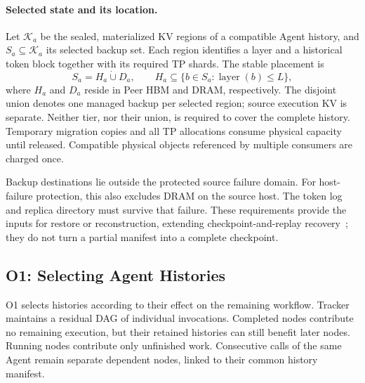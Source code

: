 \paragraph{Selected state and its location.}
Let $\mathcal K_a$ be the sealed, materialized KV regions of a compatible
Agent history, and $S_a\subseteq\mathcal K_a$ its selected backup set.
Each region identifies a layer and a historical token block together
with its required TP shards. The stable placement is
\begin{equation}
 S_a=H_a\mathbin{\dot\cup}D_a,\qquad
 H_a\subseteq\{b\in S_a:\operatorname{layer}(b)\le L\},
 \label{eq:teacher-placement}
\end{equation}
where $H_a$ and $D_a$ reside in Peer HBM and DRAM, respectively. The
disjoint union denotes one managed backup per selected region; source
execution KV is separate. Neither tier, nor their union, is required
to cover the complete history. Temporary migration copies and all TP
allocations consume physical capacity until released. Compatible
physical objects referenced by multiple consumers are charged once.

Backup destinations lie outside the protected source failure domain.
For host-failure protection, this also excludes DRAM on the source host.
The token log and replica directory must survive that failure. These
requirements provide the inputs for restore or reconstruction, extending
checkpoint-and-replay recovery~\cite{strati2024dejavu,cao2026lumen}; they
do not turn a partial manifest into a complete checkpoint.

\subsection{O1: Selecting Agent Histories}
\label{sec:teacher-agent-protection}

O1 selects histories according to their effect on the remaining workflow.
Tracker maintains a residual DAG of individual invocations. Completed
nodes contribute no remaining execution, but their retained histories
can still benefit later nodes. Running nodes contribute only unfinished
work. Consecutive calls of the same Agent remain separate dependent
nodes, linked to their common history manifest.

